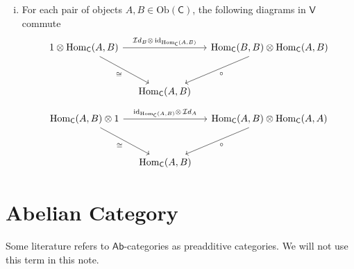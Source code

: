 {\begin{enumerate}[(i)]
\[\begin{tikzcd}[ampersand replacement=\&, column sep=small]
\end{tikzcd}
    \]
    \item For each pair of objects $A,B\in \mathrm{Ob}(\mathsf{C})$, the following diagrams in $\mathsf{V}$ commute
    \[
    \begin{tikzcd}[ampersand replacement=\&, column sep=small]
        {1\otimes \mathrm{Hom}_{\mathsf{C}}(A,B)} \arrow[rr, "{{\mathcal{I}d}_B\otimes\,\mathrm{id}_{\mathrm{Hom}_{\mathsf{C}}(A,B)}}"] \arrow[rd, "\cong"'] \&                     \& {\mathrm{Hom}_{\mathsf{C}}(B,B)\otimes \mathrm{Hom}_{\mathsf{C}}(A,B)} \arrow[ld, "\circ"] \\[+10pt]
        \& {\mathrm{Hom}_{\mathsf{C}}(A,B)} \&   
\end{tikzcd}
    \]
    \[
        \begin{tikzcd}[ampersand replacement=\&, column sep=small]
            {\mathrm{Hom}_{\mathsf{C}}(A,B)\otimes 1} \arrow[rr, "\mathrm{id}_{\mathrm{Hom}_{\mathsf{C}}(A,B)}\otimes\,{\mathcal{I}d}_A "] \arrow[rd, "\cong"'] \&                     \& {\mathrm{Hom}_{\mathsf{C}}(A,B)\otimes \mathrm{Hom}_{\mathsf{C}}(A,A)} \arrow[ld, "\circ"] \\[+10pt]
            \& {\mathrm{Hom}_{\mathsf{C}}(A,B)} \&
    \end{tikzcd}
        \]
    \end{enumerate}
}


\section{Abelian Category}
Some literature refers to $\mathsf{Ab}$-categories as preadditive categories. We will not use this term in this note.




